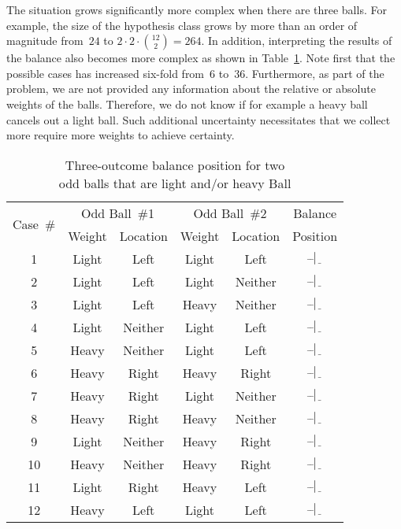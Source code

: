   \noindent
  
  The situation grows significantly more complex when there are three balls.  For example, the size of the hypothesis class grows by more than an order of magnitude from~$24$ to ${2\cdot2\cdot\binom{12}{2} = 264}.$ In addition, interpreting the results of the balance also becomes more complex as shown in Table~\ref{tab:p1TwoBallsUnknownWeights}.  Note first that the possible cases has increased six-fold from~6 to~36.  Furthermore, as part of the problem, we are not provided any information about the relative or absolute weights of the balls.  Therefore, we do not know if for example a heavy ball cancels out a light ball.  Such additional uncertainty necessitates that we collect more require more weights to achieve certainty.
  
  \begin{table}[H]
    \centering
    \caption{Three-outcome balance position for two\\odd balls that are light and/or heavy Ball}\label{tab:p1TwoBallsUnknownWeights}
    \begin{tabular}{|c||c|c||c|c||c|}
      \hline
      \multirow{2}{*}{Case~\#} & \multicolumn{2}{c||}{Odd Ball~\#1} &  \multicolumn{2}{c||}{Odd Ball~\#2} & Balance\\\cline{2-5}
          &  Weight  &  Location &  Weight  &  Location &  Position  \\ \hline\hline
      1   &  Light   &  Left     &  Light   &  Left     &  $\bar{~}\bar{~}|\underline{~~}$ \\ \hline
      2   &  Light   &  Left     &  Light   &  Neither  &  $\bar{~}\bar{~}|\underline{~~}$ \\ \hline
      3   &  Light   &  Left     &  Heavy   &  Neither  &  $\bar{~}\bar{~}|\underline{~~}$ \\ \hline
      4   &  Light   &  Neither  &  Light   &  Left     &  $\bar{~}\bar{~}|\underline{~~}$ \\ \hline
      5   &  Heavy   &  Neither  &  Light   &  Left     &  $\bar{~}\bar{~}|\underline{~~}$ \\ \hline
      6   &  Heavy   &  Right    &  Heavy   &  Right    &  $\bar{~}\bar{~}|\underline{~~}$ \\ \hline
      7   &  Heavy   &  Right    &  Light   &  Neither  &  $\bar{~}\bar{~}|\underline{~~}$ \\ \hline
      8   &  Heavy   &  Right    &  Heavy   &  Neither  &  $\bar{~}\bar{~}|\underline{~~}$ \\ \hline
      9   &  Light   &  Neither  &  Heavy   &  Right    &  $\bar{~}\bar{~}|\underline{~~}$ \\ \hline
      10  &  Heavy   &  Neither  &  Heavy   &  Right    &  $\bar{~}\bar{~}|\underline{~~}$ \\ \hline
      11  &  Light   &  Right    &  Heavy   &  Left     &  $\bar{~}\bar{~}|\underline{~~}$ \\ \hline
      12  &  Heavy   &  Left     &  Light   &  Left     &  $\bar{~}\bar{~}|\underline{~~}$ \\ \hline\hline
         

\end{tabular}
\end{table}
